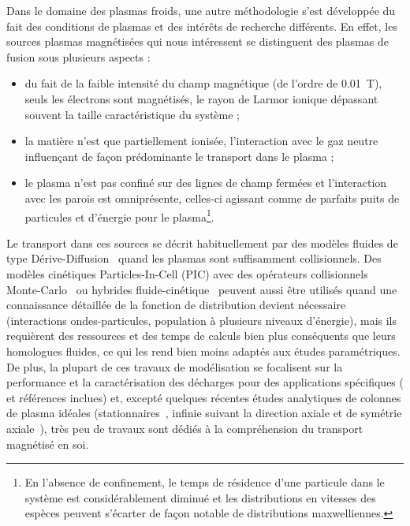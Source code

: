 \begin{refsection}
Dans le domaine des plasmas froids, une autre méthodologie s'est développée du
fait des conditions de plasmas et des intérêts de recherche
différents. En effet, les sources plasmas magnétisées qui nous intéressent
se distinguent des plasmas de fusion sous plusieurs aspects :

\begin{itemize}
  \item du fait de la faible intensité du champ magnétique (de l'ordre de
  0.01~T), seuls les électrons sont magnétisés, le rayon de Larmor ionique
  dépassant souvent la taille caractéristique du système ;
  \item la matière n'est que partiellement ionisée, l'interaction avec
  le gaz neutre influençant de façon prédominante le transport dans le plasma ;
  \item le plasma n'est pas confiné sur des lignes de champ fermées et
  l'interaction avec les parois est omniprésente, celles-ci agissant comme de
  parfaits puits de particules et d'énergie pour le plasma\footnote{
  En l'absence de confinement, le temps de résidence d'une particule dans le
  système est considérablement diminué et les distributions en vitesses des
  espèces peuvent s'écarter de façon notable de distributions maxwelliennes.}.
\end{itemize}

Le transport dans ces sources se décrit habituellement par des modèles fluides
de type Dérive-Diffusion~\parencite{Porteous,Lieberman,Rozhansky} quand les
plasmas sont suffisamment collisionnels. Des modèles
cinétiques Particles-In-Cell (PIC) avec des opérateurs collisionnels
Monte-Carlo~\parencite{PIC3D,Adam} ou hybrides
fluide-cinétique~\parencite{BoeufGarrigues} peuvent aussi être utilisés quand
une connaissance détaillée de la fonction de distribution devient nécessaire
(interactions ondes-particules, population à plusieurs niveaux d'énergie), mais
ils requièrent des ressources et des temps de calculs bien plus conséquents que
leurs homologues fluides, ce qui les rend bien moins adaptés aux études
paramétriques. De plus, la plupart de ces travaux de modélisation se focalisent
sur la performance et la caractérisation des décharges pour des applications
spécifiques (\parencite{Lieberman} et références inclues) et, excepté quelques
récentes études analytiques de colonnes de plasma idéales
(stationnaires~\parencite{Sternberg}, infinie suivant la direction axiale et de
symétrie axiale~\parencite{Fruchtman}), très peu de travaux sont dédiés à la
compréhension du transport magnétisé en soi.


\end{refsection}
